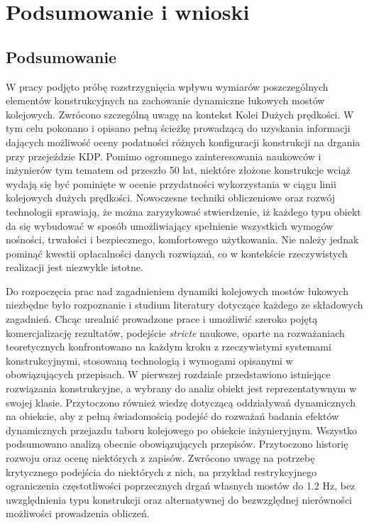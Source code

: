 \chapter*{Podsumowanie i wnioski}
\section*{Podsumowanie}
W pracy podjęto próbę rozstrzygnięcia wpływu wymiarów poszczególnych elementów konstrukcyjnych na zachowanie dynamiczne łukowych mostów kolejowych. Zwrócono szczególną uwagę na kontekst Kolei Dużych prędkości. W tym celu pokonano i opisano pełną ścieżkę prowadzącą do uzyskania informacji dających możliwość oceny podatności różnych konfiguracji konstrukcji na drgania przy przejeździe KDP. Pomimo ogromnego zainteresowania naukowców i inżynierów tym tematem od przeszło 50 lat, niektóre złożone konstrukcje wciąż wydają się być pominięte w ocenie przydatności wykorzystania w ciągu linii kolejowych dużych prędkości. Nowoczesne techniki obliczeniowe oraz rozwój technologii sprawiają, że można zaryzykować stwierdzenie, iż każdego typu obiekt da się wybudować w sposób umożliwiający spełnienie wszystkich wymogów nośności, trwałości i bezpiecznego, komfortowego użytkowania. Nie należy jednak pominąć kwestii opłacalności danych rozwiązań, co w kontekście rzeczywistych realizacji jest niezwykle istotne.

Do rozpoczęcia prac nad zagadnieniem dynamiki kolejowych mostów łukowych niezbędne było rozpoznanie i studium literatury dotyczące każdego ze składowych zagadnień. Chcąc urealnić prowadzone prace i umożliwić szeroko pojętą komercjalizację rezultatów, podejście \textit{stricte} naukowe, oparte na rozważaniach teoretycznych konfrontowano na każdym kroku z rzeczywistymi systemami konstrukcyjnymi, stosowaną technologią i wymogami opisanymi w obowiązujących przepisach. W pierwszej rozdziale przedstawiono istniejące rozwiązania konstrukcyjne, a wybrany do analiz obiekt jest reprezentatywnym w swojej klasie. Przytoczono również wiedzę dotyczącą oddziaływań dynamicznych na obiekcie, aby z pełną świadomością podejść do rozważań badania efektów dynamicznych przejazdu taboru kolejowego po obiekcie inżynieryjnym. Wszystko podsumowano analizą obecnie obowiązujących przepisów. Przytoczono historię rozwoju oraz ocenę niektórych z zapisów. Zwrócono uwagę na potrzebę krytycznego podejścia do niektórych z nich, na przykład restrykcyjnego ograniczenia częstotliwości poprzecznych drgań własnych mostów do 1.2 Hz, bez uwzględnienia typu konstrukcji oraz alternatywnej do bezwzględnej nierówności możliwości prowadzenia obliczeń. 

